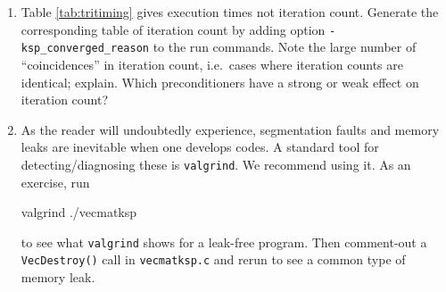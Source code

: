 \begin{enumerate}
\item Table \ref{tab:tritiming} gives execution times not iteration count.  Generate the corresponding table of \pKSP iteration count by adding option \verb|-ksp_converged_reason| to the run commands.  Note the large number of ``coincidences'' in iteration count, i.e.~cases where iteration counts are identical; explain.  Which preconditioners have a strong or weak effect on iteration count?

\item As the reader will undoubtedly experience, segmentation faults and memory leaks are inevitable when one develops \PETSc codes.  A standard tool for detecting/diagnosing these is \texttt{valgrind}.  We recommend using it.  As an exercise, run
\begin{cline}
valgrind ./vecmatksp
\end{cline}
to see what \texttt{valgrind} shows for a leak-free program.  Then comment-out a \texttt{VecDestroy()} call in \texttt{vecmatksp.c} and rerun to see a common type of memory leak.


\end{enumerate}
